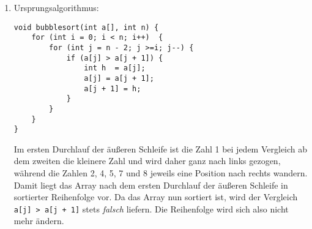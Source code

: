 \documentclass[11pt,a4paper]{article}
\begin{document}
\begin{loesung}
\begin{enumerate}
\begin{proof}
            Der Einfluss auf \texttt{a} innerhalb eines Durchlaufs der äußeren Schleife ist also für beide Algorithmen identisch.
            Deshalb stimmt der Inhalt des Arrays nach jedem Durchlauf überein.
        \end{proof}

        Der Zeitaufwand ändert sich nur um einen konstanten Wert in der äußeren und um einen konstanten Wert in der inneren Schleife. Das Laufzeitverhalten bleibt daher unverändert (Best-Case: $\Theta(n))$, Average- und Worst-Case: $\Theta(n^2)$).

        Der neue Algorithmus ist vermutlich trotzdem langsamer, da er insgesamt mehr Zuweisungen benötigt, da jeder Aufruf von \texttt{swap} 3 Zuweisungen umfasst.
        Innerhalb eines Durchlaufs der äußeren Schleife benötigt der Ursprungsalgorithmus für $k$ Durchläufe der inneren Schleife insgesamt $3 + 2k$ Zuweisungen, der neue jedoch $2 + 4k$ Zuweisungen.
        Dies entspricht für große Eingaben also etwa doppelt so vielen Zuweisungen.
        Alle anderen Operationen (Leseoperationen, Vergleiche) bleiben jedoch unverändert.

        \item
        Ursprungsalgorithmus:
        \begin{lstlisting}
void bubblesort(int a[], int n) {
    for (int i = 0; i < n; i++)  {
        for (int j = n - 2; j >=i; j--) {
            if (a[j] > a[j + 1]) {
                int h  = a[j];
                a[j] = a[j + 1];
                a[j + 1] = h;
            }
        }
    }
} 
        \end{lstlisting}
        Im ersten Durchlauf der äußeren Schleife ist die Zahl 1 bei jedem Vergleich ab dem zweiten die kleinere Zahl und wird daher ganz nach links gezogen, während die Zahlen 2, 4, 5, 7 und 8 jeweils eine Position nach rechts wandern.
        Damit liegt das Array nach dem ersten Durchlauf der äußeren Schleife in sortierter Reihenfolge vor.
        Da das Array nun sortiert ist, wird der Vergleich \texttt{a[j] > a[j + 1]} stets \textit{falsch} liefern.
        Die Reihenfolge wird sich also nicht mehr ändern.


\end{enumerate}
\end{loesung}
\end{document}
